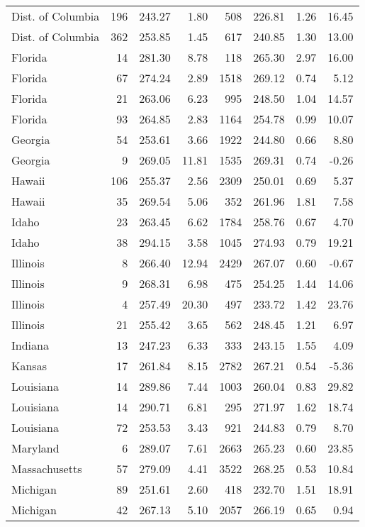 \begin{longtable}{lrrr@{\extracolsep{10pt}}rrrr}
  Dist. of Columbia & 196 & 243.27 & 1.80 & 508 & 226.81 & 1.26 & 16.45 \\ 
  Dist. of Columbia & 362 & 253.85 & 1.45 & 617 & 240.85 & 1.30 & 13.00 \\ 
  Florida &  14 & 281.30 & 8.78 & 118 & 265.30 & 2.97 & 16.00 \\ 
  Florida &  67 & 274.24 & 2.89 & 1518 & 269.12 & 0.74 & 5.12 \\ 
  Florida &  21 & 263.06 & 6.23 & 995 & 248.50 & 1.04 & 14.57 \\ 
  Florida &  93 & 264.85 & 2.83 & 1164 & 254.78 & 0.99 & 10.07 \\ 
  Georgia &  54 & 253.61 & 3.66 & 1922 & 244.80 & 0.66 & 8.80 \\ 
  Georgia &   9 & 269.05 & 11.81 & 1535 & 269.31 & 0.74 & -0.26 \\ 
  Hawaii & 106 & 255.37 & 2.56 & 2309 & 250.01 & 0.69 & 5.37 \\ 
  Hawaii &  35 & 269.54 & 5.06 & 352 & 261.96 & 1.81 & 7.58 \\ 
  Idaho &  23 & 263.45 & 6.62 & 1784 & 258.76 & 0.67 & 4.70 \\ 
  Idaho &  38 & 294.15 & 3.58 & 1045 & 274.93 & 0.79 & 19.21 \\ 
  Illinois &   8 & 266.40 & 12.94 & 2429 & 267.07 & 0.60 & -0.67 \\ 
  Illinois &   9 & 268.31 & 6.98 & 475 & 254.25 & 1.44 & 14.06 \\ 
  Illinois &   4 & 257.49 & 20.30 & 497 & 233.72 & 1.42 & 23.76 \\ 
  Illinois &  21 & 255.42 & 3.65 & 562 & 248.45 & 1.21 & 6.97 \\ 
  Indiana &  13 & 247.23 & 6.33 & 333 & 243.15 & 1.55 & 4.09 \\ 
  Kansas &  17 & 261.84 & 8.15 & 2782 & 267.21 & 0.54 & -5.36 \\ 
  Louisiana &  14 & 289.86 & 7.44 & 1003 & 260.04 & 0.83 & 29.82 \\ 
  Louisiana &  14 & 290.71 & 6.81 & 295 & 271.97 & 1.62 & 18.74 \\ 
  Louisiana &  72 & 253.53 & 3.43 & 921 & 244.83 & 0.79 & 8.70 \\ 
  Maryland &   6 & 289.07 & 7.61 & 2663 & 265.23 & 0.60 & 23.85 \\ 
  Massachusetts &  57 & 279.09 & 4.41 & 3522 & 268.25 & 0.53 & 10.84 \\ 
  Michigan &  89 & 251.61 & 2.60 & 418 & 232.70 & 1.51 & 18.91 \\ 
  Michigan &  42 & 267.13 & 5.10 & 2057 & 266.19 & 0.65 & 0.94 \\ 

\end{longtable}
